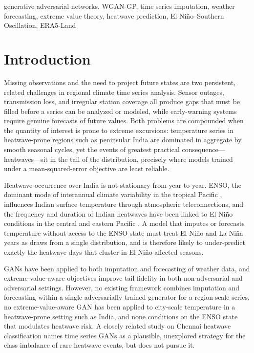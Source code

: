\documentclass[conference]{IEEEtran}
\begin{document}
\begin{IEEEkeywords}
generative adversarial networks, WGAN-GP, time series imputation, weather forecasting, extreme value
theory, heatwave prediction, El Ni\~{n}o--Southern Oscillation, ERA5-Land
\end{IEEEkeywords}

\section{Introduction}

Missing observations and the need to project future states are two persistent, related challenges in
regional climate time series analysis. Sensor outages, transmission loss, and irregular station
coverage all produce gaps that must be filled before a series can be analyzed or modeled, while
early-warning systems require genuine forecasts of future values. Both problems are compounded when the
quantity of interest is prone to extreme excursions: temperature series in heatwave-prone regions such
as peninsular India are dominated in aggregate by smooth seasonal cycles, yet the events of greatest
practical consequence---heatwaves---sit in the tail of the distribution, precisely where models trained
under a mean-squared-error objective are least reliable.

Heatwave occurrence over India is not stationary from year to year. ENSO, the dominant mode of
interannual climate variability in the tropical Pacific \cite{trenberth1997definition,mcphaden2006enso},
influences Indian surface temperature through atmospheric teleconnections, and the frequency and
duration of Indian heatwaves have been linked to El Ni\~{n}o conditions in the central and eastern
Pacific \cite{rohini2016variability,ratnam2016anatomy}. A model that imputes or forecasts temperature
without access to the ENSO state must treat El Ni\~{n}o and La Ni\~{n}a years as draws from a single
distribution, and is therefore likely to under-predict exactly the heatwave days that cluster in
El Ni\~{n}o-affected seasons.

GANs \cite{goodfellow2014generative} have been applied to both imputation \cite{luo2018multivariate}
and forecasting \cite{bihlo2021generative} of weather data, and extreme-value-aware objectives improve
tail fidelity in both non-adversarial \cite{ding2019modeling} and adversarial
\cite{huster2021pareto,bhatia2021exgan,boulaguiem2022modeling} settings. However, no existing framework
combines imputation and forecasting within a single adversarially-trained generator for a region-scale
series, no extreme-value-aware GAN has been applied to city-scale temperature in a heatwave-prone
setting such as India, and none conditions on the ENSO state that modulates heatwave risk. A closely
related study on Chennai heatwave classification \cite{choudary2025comparative} names time series GANs
as a plausible, unexplored strategy for the class imbalance of rare heatwave events, but does not pursue
it.
\end{document}
